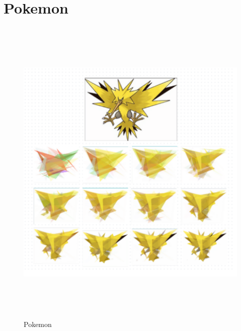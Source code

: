 \section{Pokemon}
\begin{figure}
\centering
\includegraphics[width=5in,height=6in]{images/7a 2.png}
\caption{Pokemon}
\end{figure}
\clearpage


